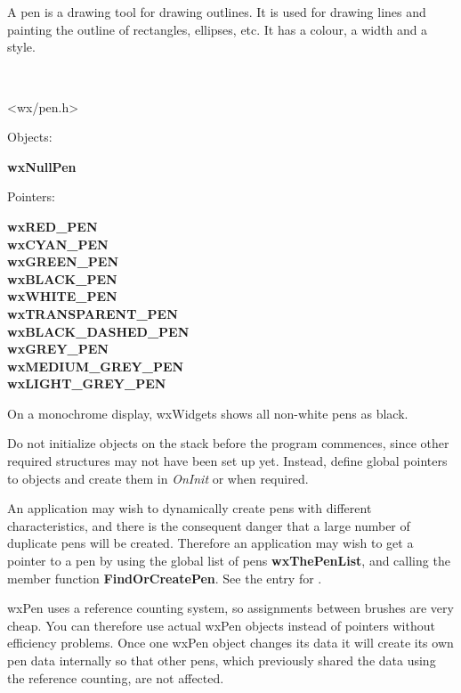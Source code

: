 \section{}\label{wxpen}

A pen is a drawing tool for drawing outlines. It is used for drawing
lines and painting the outline of rectangles, ellipses, etc. It has a
colour, a width and a style. 


\\


<wx/pen.h>


Objects:

{\bf wxNullPen}

Pointers:

{\bf wxRED\_PEN\\
wxCYAN\_PEN\\
wxGREEN\_PEN\\
wxBLACK\_PEN\\
wxWHITE\_PEN\\
wxTRANSPARENT\_PEN\\
wxBLACK\_DASHED\_PEN\\
wxGREY\_PEN\\
wxMEDIUM\_GREY\_PEN\\
wxLIGHT\_GREY\_PEN}


On a monochrome display, wxWidgets shows all non-white pens as black.

Do not initialize objects on the stack before the program commences,
since other required structures may not have been set up yet. Instead,
define global pointers to objects and create them in {\it OnInit} or
when required.

An application may wish to dynamically create pens with different
characteristics, and there is the consequent danger that a large number
of duplicate pens will be created. Therefore an application may wish to
get a pointer to a pen by using the global list of pens {\bf
wxThePenList}, and calling the member function {\bf FindOrCreatePen}.
See the entry for .

wxPen uses a reference counting system, so assignments between brushes are very
cheap. You can therefore use actual wxPen objects instead of pointers without
efficiency problems. Once one wxPen object changes its data it will create its
own pen data internally so that other pens, which previously shared the
data using the reference counting, are not affected.

